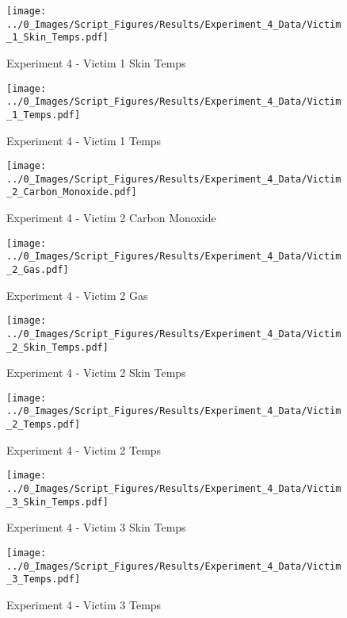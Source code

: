 	\clearpage

	\begin{figure}[H]
		\centering
		\texttt{[image: ../0\_Images/Script\_Figures/Results/Experiment\_4\_Data/Victim\_1\_Skin\_Temps.pdf]}
		\caption[]{Experiment 4 - Victim 1 Skin Temps}
	\end{figure}
 

	\begin{figure}[H]
		\centering
		\texttt{[image: ../0\_Images/Script\_Figures/Results/Experiment\_4\_Data/Victim\_1\_Temps.pdf]}
		\caption[]{Experiment 4 - Victim 1 Temps}
	\end{figure}
 
	\clearpage

	\begin{figure}[H]
		\centering
		\texttt{[image: ../0\_Images/Script\_Figures/Results/Experiment\_4\_Data/Victim\_2\_Carbon\_Monoxide.pdf]}
		\caption[]{Experiment 4 - Victim 2 Carbon Monoxide}
	\end{figure}
 

	\begin{figure}[H]
		\centering
		\texttt{[image: ../0\_Images/Script\_Figures/Results/Experiment\_4\_Data/Victim\_2\_Gas.pdf]}
		\caption[]{Experiment 4 - Victim 2 Gas}
	\end{figure}
 
	\clearpage

	\begin{figure}[H]
		\centering
		\texttt{[image: ../0\_Images/Script\_Figures/Results/Experiment\_4\_Data/Victim\_2\_Skin\_Temps.pdf]}
		\caption[]{Experiment 4 - Victim 2 Skin Temps}
	\end{figure}
 

	\begin{figure}[H]
		\centering
		\texttt{[image: ../0\_Images/Script\_Figures/Results/Experiment\_4\_Data/Victim\_2\_Temps.pdf]}
		\caption[]{Experiment 4 - Victim 2 Temps}
	\end{figure}
 
	\clearpage

	\begin{figure}[H]
		\centering
		\texttt{[image: ../0\_Images/Script\_Figures/Results/Experiment\_4\_Data/Victim\_3\_Skin\_Temps.pdf]}
		\caption[]{Experiment 4 - Victim 3 Skin Temps}
	\end{figure}
 

	\begin{figure}[H]
		\centering
		\texttt{[image: ../0\_Images/Script\_Figures/Results/Experiment\_4\_Data/Victim\_3\_Temps.pdf]}
		\caption[]{Experiment 4 - Victim 3 Temps}
	\end{figure}
 
